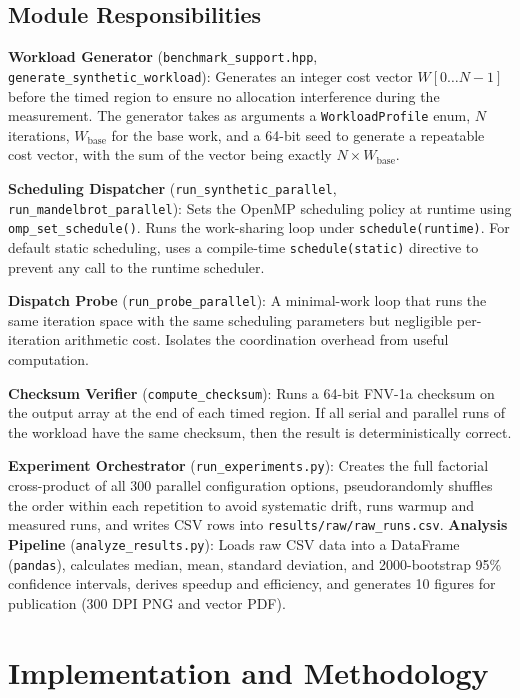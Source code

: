 \documentclass[conference]{IEEEtran}
\begin{document}
\subsection{Module Responsibilities}

\textbf{Workload Generator} (\texttt{benchmark\_support.hpp}, \texttt{generate\_synthetic\_workload}): Generates an integer cost vector \(W[0 \ldots N-1]\) before the timed region to ensure no allocation interference during the measurement. The generator takes as arguments a \texttt{WorkloadProfile} enum, \(N\) iterations, \(W_{\text{base}}\) for the base work, and a 64-bit seed to generate a repeatable cost vector, with the sum of the vector being exactly \(N \times W_{\text{base}}\).

\textbf{Scheduling Dispatcher} (\texttt{run\_synthetic\_parallel}, \texttt{run\_mandelbrot\_parallel}): Sets the OpenMP scheduling policy at runtime using \texttt{omp\_set\_schedule()}. Runs the work-sharing loop under \texttt{schedule(runtime)}. For default static scheduling, uses a compile-time \texttt{schedule(static)} directive to prevent any call to the runtime scheduler.

\textbf{Dispatch Probe} (\texttt{run\_probe\_parallel}): A minimal-work loop that runs the same iteration space with the same scheduling parameters but negligible per-iteration arithmetic cost. Isolates the coordination overhead from useful computation.

\textbf{Checksum Verifier} (\texttt{compute\_checksum}): Runs a 64-bit FNV-1a checksum on the output array at the end of each timed region. If all serial and parallel runs of the workload have the same checksum, then the result is deterministically correct.

\textbf{Experiment Orchestrator} (\texttt{run\_experiments.py}): Creates the full factorial cross-product of all 300 parallel configuration options, pseudorandomly shuffles the order within each repetition to avoid systematic drift, runs warmup and measured runs, and writes CSV rows into \texttt{results/raw/raw\_runs.csv}.
\textbf{Analysis Pipeline} (\texttt{analyze\_results.py}): Loads raw CSV data into a DataFrame (\texttt{pandas}), calculates median, mean, standard deviation, and 2000-bootstrap 95\% confidence intervals, derives speedup and efficiency, and generates 10 figures for publication (300 DPI PNG and vector PDF).

\section{Implementation and Methodology}
\end{document}
